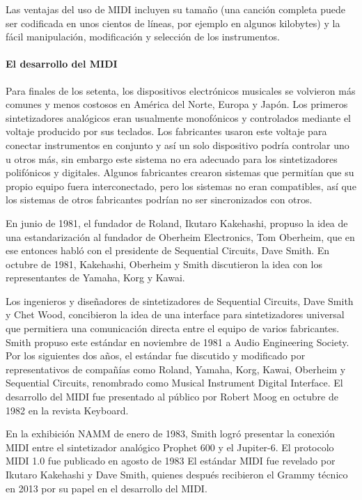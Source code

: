 \documentclass[a4paper,11pt,oneside]{book}
\begin{document}
Las ventajas del uso de MIDI incluyen su tamaño (una canción completa puede ser codificada en unos cientos de líneas, por ejemplo en algunos kilobytes) y la fácil manipulación, modificación y selección de los instrumentos.

\paragraph{El desarrollo del MIDI}

Para finales de los setenta, los dispositivos electrónicos musicales se volvieron más comunes y menos costosos en América del Norte, Europa y Japón. Los primeros sintetizadores analógicos eran usualmente monofónicos y controlados mediante el voltaje producido por sus teclados. Los fabricantes usaron este voltaje para conectar instrumentos en conjunto y así un solo dispositivo podría controlar uno u otros más, sin embargo este sistema no era adecuado para los sintetizadores polifónicos y digitales. Algunos fabricantes crearon sistemas que permitían que su propio equipo fuera interconectado, pero los sistemas no eran compatibles, así que los sistemas de otros fabricantes podrían no ser sincronizados con otros.

En junio de 1981, el fundador de Roland, Ikutaro Kakehashi, propuso la idea de una estandarización al fundador de Oberheim Electronics, Tom Oberheim, que en ese entonces habló con el presidente de Sequential Circuits, Dave Smith. En octubre de 1981, Kakehashi, Oberheim y Smith discutieron la idea con los representantes de Yamaha, Korg y Kawai.

Los ingenieros y diseñadores de sintetizadores de Sequential Circuits, Dave Smith y Chet Wood, concibieron la idea de una interface para sintetizadores universal que permitiera una comunicación directa entre el equipo de varios fabricantes. Smith propuso este estándar en noviembre de 1981 a Audio Engineering Society. Por los siguientes dos años, el estándar fue discutido y modificado por representativos de compañías como Roland, Yamaha, Korg, Kawai, Oberheim y Sequential Circuits, renombrado como Musical Instrument Digital Interface. El desarrollo del MIDI fue presentado al público por Robert Moog en octubre de 1982 en la revista Keyboard.

En la exhibición NAMM de enero de 1983, Smith logró presentar la conexión MIDI entre el sintetizador analógico Prophet 600 y el Jupiter-6. El protocolo MIDI 1.0 fue publicado en agosto de 1983 El estándar MIDI fue revelado por Ikutaro Kakehashi y Dave Smith, quienes después recibieron el Grammy técnico en 2013 por su papel en el desarrollo del MIDI.
\end{document}
